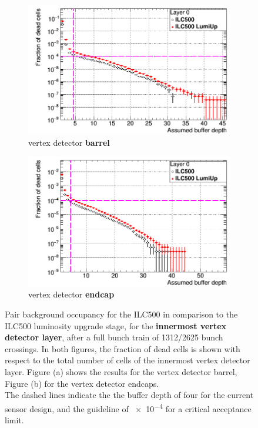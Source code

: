 \begin{figure}
 \centering
  \begin{subfigure}[b]{0.49\textwidth}
   \centering
    \includegraphics[width=\textwidth]{Figures/Pairs/Occupancy_Comparison_Layer_0_deadcells_ILC500vsLumiUp_SiVertexBarrel_corrected_Barrel_size.png}
   \caption{\sid vertex detector \textbf{barrel}}
   \end{subfigure}
   \hfill
    \begin{subfigure}[b]{0.49\textwidth}
   \centering
    \includegraphics[width=\textwidth]{Figures/Pairs/Occupancy_Comparison_Layer_0_deadcells_ILC500_LumiUp_SiVertexEndcap.png}
   \caption{\sid vertex detector \textbf{endcap}}
   \end{subfigure}
   \caption[Pair background occupancy in the \sid vertex detector for the ILC500 and the ILC500 ``Lumi Up'']{Pair background occupancy for the ILC500 in comparison to the ILC500 luminosity upgrade stage, for the \textbf{innermost \sid vertex detector layer}, after a full bunch train of \num{1312}/\num{2625} bunch crossings.
   In both figures, the fraction of dead cells is shown with respect to the total number of cells of the innermost vertex detector layer.
   Figure (a) shows the results for the vertex detector barrel, Figure (b) for the vertex detector endcaps.
   \\The dashed lines indicate the the buffer depth of four for the current sensor design, and the guideline of \num{e-4} for a critical acceptance limit.
   }
   \label{fig:PairBkg:ILC500-ILC500LumiUp_Occupancy}
 \end{figure}

